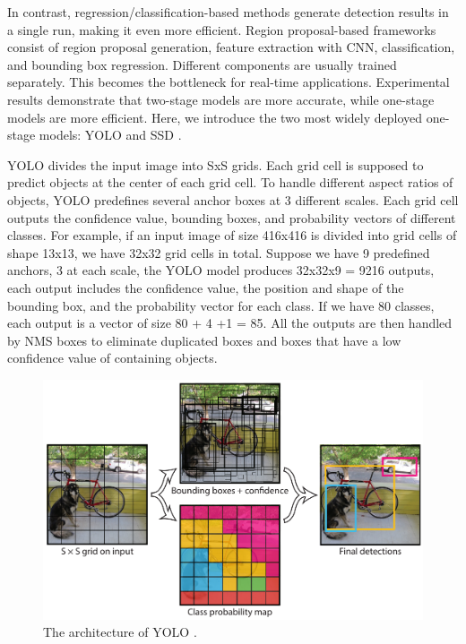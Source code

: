 
In contrast, regression/classification-based methods generate detection results in a single run, making it even more efficient. Region proposal-based frameworks consist of region proposal generation, feature extraction with CNN, classification, and bounding box regression. Different components are usually trained separately. This becomes the bottleneck for real-time applications.  Experimental results demonstrate that two-stage models are more accurate, while one-stage models are more efficient. Here, we introduce the two most widely deployed one-stage models: YOLO \citep{redmon2016you} and SSD \citep{liu2016ssd}. 

YOLO divides the input image into SxS grids. Each grid cell is supposed to predict objects at the center of each grid cell. To handle different aspect ratios of objects, YOLO predefines several anchor boxes at 3 different scales. Each grid cell outputs the confidence value, bounding boxes, and probability vectors of different classes. For example, if an input image of size 416x416 is divided into grid cells of shape 13x13, we have 32x32 grid cells in total. Suppose we have 9 predefined anchors, 3 at each scale, the YOLO model produces 32x32x9 = 9216 outputs, each output includes the confidence value, the position and shape of the bounding box, and the probability vector for each class. If we have 80 classes, each output is a vector of size 80 + 4 +1 = 85. All the outputs are then handled by NMS boxes to eliminate duplicated boxes and boxes that have a low confidence value of containing objects.

\begin{figure}[H]
\centering
\includegraphics[scale=0.6]{figures/chapter_detection/yolo.png}
\caption{The architecture of YOLO \citep{redmon2016you}.}
\label{fig.yolo}
\end{figure}

